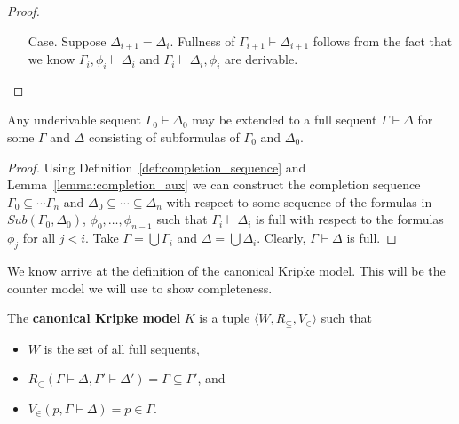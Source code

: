 \documentclass{article}
\begin{document}
\begin{proof}
\begin{itemize}
\begin{itemize}
\begin{itemize}
      \item[Case.] Suppose $\Delta_{i+1} = \Delta_{i}$.  Fullness of $\Gamma_{i+1} \vdash \Delta_{i+1}$
        follows from the fact that we know $\Gamma_i,\phi_i \vdash \Delta_i$ and
        $\Gamma_i \vdash \Delta_i,\phi_i$ are derivable.  
      \end{itemize}

    \end{itemize}

  \end{itemize}

\end{proof}

\begin{lemma}[Completion]
  \label{lemma:completion}
  Any underivable sequent $\Gamma_0 \vdash \Delta_0$ may be extended to a full sequent
  $\Gamma \vdash \Delta$ for some $\Gamma$ and $\Delta$ consisting of subformulas of 
  $\Gamma_0$ and $\Delta_0$.
\end{lemma}
\begin{proof}
  Using Definition~\ref{def:completion_sequence} and Lemma~\ref{lemma:completion_aux} we 
  can construct the completion sequence $\Gamma_0 \subseteq \cdots \Gamma_n$ and
  $\Delta_0 \subseteq \cdots \subseteq \Delta_n$ with respect to some sequence of
  the formulas in $Sub(\Gamma_0,\Delta_0)$, $\phi_0,\ldots ,\phi_{n-1}$ such that 
  $\Gamma_i \vdash \Delta_i$ is full with respect to the formulas $\phi_j$ for all
  $j < i$.  Take $\Gamma = \bigcup \Gamma_i$ and $\Delta = \bigcup \Delta_i$.  
  Clearly, $\Gamma \vdash \Delta$ is full.  
\end{proof}

We know arrive at the definition of the canonical Kripke model. This
will be the counter model we will use to show completeness.

\begin{definition}
  \label{def:canon_model}
  The \textbf{canonical Kripke model} $K$ is a tuple $\langle W, R_\subseteq, V_{\in} \rangle$
  such that 
  \begin{center}
    \begin{itemize}
    \item $W$ is the set of all full sequents,
    \item $R_\subset(\Gamma \vdash \Delta,\Gamma' \vdash \Delta') = \Gamma \subseteq \Gamma'$, and
    \item $V_\in(p, \Gamma \vdash \Delta) = p \in \Gamma$.
    \end{itemize}
  \end{center}
\end{definition}
\end{document}
